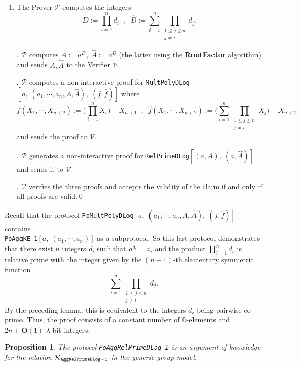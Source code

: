 \documentclass[11pt, lettersize, notitlepage, leqno, footskip=0.6cm]{article}
\newcommand{\pl}{\prod\limits}
\newcommand{\slim}{\sum\limits}
\newcommand{\mc}{\mathcal}
\newcommand{\mb}{\mathbb}
\newcommand{\mbf}{\mathbf}
\newcommand{\lam}{\lambda}
\newcommand{\what}{\widehat}
\newcommand{\bO}{\mbf{O}}
\newcommand{\mP}{\mc{P}}
\newcommand{\V}{\mc{V}}
\newcommand{\vs}{\vspace{-0.15cm}}
\newcommand{\noin}{\noindent}
\newtheorem{Prop}[Thm]{Proposition}
\numberwithin{equation}{section}
\begin{document}
\begin{enumerate}[wide, labelwidth=!, labelindent=0pt]\vs \item The Prover $\mP$ computes the integers \vs $$D:=\pl_{i=1}^n d_i\;\;,\;\; \what{D}:= \slim_{i=1}^n \pl_{\substack{1\leq j\leq n \\ j\neq i}} d_j.$$ \vs

\noin 2. $\mP$ computes $A:= a^D,\;\what{A}:= a^{\what{D}} $ (the latter using the \textbf{RootFactor} algorithm) and sends $A,\what{A}$ to the Verifier $\V$.

\begin{comment}
\noin 3. $\mP$ computes a non-interactive proof for \verb|AggKE-1|$[a,\;(a_1,\cdots,a_n)]$ and sends it to $\V$.

\noin 4. \end{comment}


\noin 3. $\mP$ computes a non-interactive proof for \verb|MultPolyDLog|$[a,\;(a_1,\cdots,a_n,A, \what{A}),\; (f,\what{f})]$ where \vs $$f(X_1,\cdots,X_{n+2}):= \big(\pl_{i=1}^n X_i\big) -X_{n+1}\;\;,\;\;\what{f}(X_1,\cdots, X_{n+2}):= \big(\slim_{i=1}^n \pl_{\substack{1\leq j\leq n \\ j\neq i}} X_j\big) - X_{n+2}$$ and sends the proof to $\V$.

\noin 4. $\mP$ generates a non-interactive proof for \verb|RelPrimeDLog|$[(a,A),\;(a,\what{A})]$ and sends it to $\V$.

\noin 5. $\V$ verifies the three proofs and accepts the validity of the claim if and only if all proofs are valid.\qed \end{enumerate}

Recall that the protocol \verb|PoMultPolyDLog|$[a,\;(a_1,\cdots,a_n,A, \what{A}),\; (f,\what{f})]$  contains\\ \verb|PoAggKE-1|$[a,\;(a_1,\cdots,a_n)]$ as a subprotocol. So this last protocol demonstrates that there exist $n$ integers $d_i$ such that $a^{d_i} = a_i$ and the product $\pl_{i=1}^n d_i$ is relative prime with the integer given by the $(n-1)$-th elementary symmetric function \vs $$\slim_{i=1}^n \pl_{\substack{1\leq j\leq n \\ j\neq i}} d_j. $$ By the preceding lemma, this is equivalent to the integers $d_i$ being pairwise co-prime. Thus, the proof consists of a constant number of $\mb{G}$-elements and $2n+\bO(1)$ $\lam$-bit integers. 



\begin{Prop} The protocol \verb|PoAggRelPrimeDLog-1| is an argument of knowledge for the relation $\mc{R}_{\tt{AggRelPrimeDLog-1}}$ in the generic group model.\end{Prop}
\end{document}
